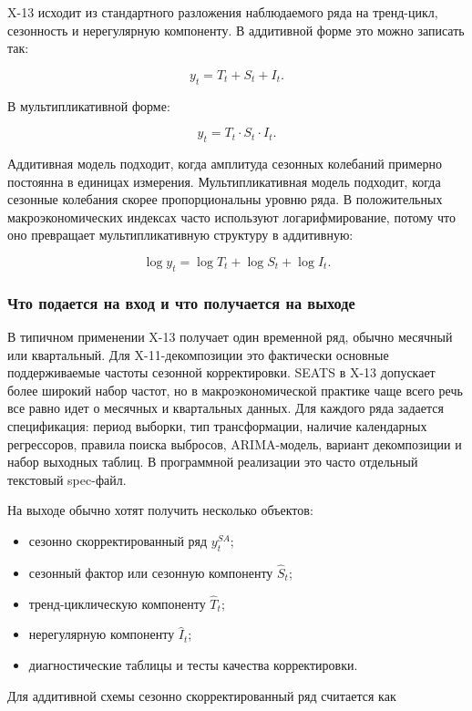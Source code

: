 \documentclass[12pt,fleqn]{article}
\begin{document}
X-13 исходит из стандартного разложения наблюдаемого ряда на тренд-цикл, сезонность и нерегулярную компоненту.
В аддитивной форме это можно записать так:

\[
y_t
=
T_t
+S_t
+I_t.
\]

В мультипликативной форме:

\[
y_t
=
T_t
\cdot
S_t
\cdot
I_t.
\]

Аддитивная модель подходит, когда амплитуда сезонных колебаний примерно постоянна в единицах измерения.
Мультипликативная модель подходит, когда сезонные колебания скорее пропорциональны уровню ряда.
В положительных макроэкономических индексах часто используют логарифмирование, потому что оно превращает мультипликативную структуру в аддитивную:

\[
\log y_t
=
\log T_t
+\log S_t
+\log I_t.
\]

\subsubsection{Что подается на вход и что получается на выходе}

В типичном применении X-13 получает один временной ряд, обычно месячный или квартальный.
Для X-11-декомпозиции это фактически основные поддерживаемые частоты сезонной корректировки.
SEATS в X-13 допускает более широкий набор частот, но в макроэкономической практике чаще всего речь все равно идет о месячных и квартальных данных.
Для каждого ряда задается спецификация: период выборки, тип трансформации, наличие календарных регрессоров, правила поиска выбросов, ARIMA-модель, вариант декомпозиции и набор выходных таблиц.
В программной реализации это часто отдельный текстовый spec-файл.

На выходе обычно хотят получить несколько объектов:

\begin{itemize}
  \item сезонно скорректированный ряд \(y_t^{SA}\);
  \item сезонный фактор или сезонную компоненту \(\hat S_t\);
  \item тренд-циклическую компоненту \(\hat T_t\);
  \item нерегулярную компоненту \(\hat I_t\);
  \item диагностические таблицы и тесты качества корректировки.
\end{itemize}

Для аддитивной схемы сезонно скорректированный ряд считается как
\end{document}

